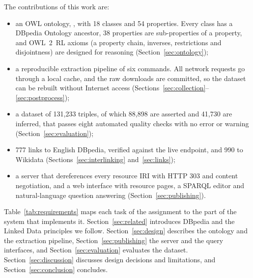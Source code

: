 The contributions of this work are:
\begin{itemize}
  \item an OWL ontology, , with 18 classes and 54 properties. Every
        class has a DBpedia Ontology ancestor, 38 properties are
        sub-properties of a  property, and OWL~2~RL axioms
        (a property chain, inverses, restrictions and disjointness) are
        designed for reasoning (Section~\ref{sec:ontology});
  \item a reproducible extraction pipeline of six commands. All network
        requests go through a local cache, and the raw downloads are
        committed, so the dataset can be rebuilt without Internet access
        (Sections~\ref{sec:collection}--\ref{sec:postprocess});
  \item a dataset of 131{,}233 triples, of which 88{,}898 are asserted and
        41{,}730 are inferred, that passes eight automated quality checks with
        no error or warning (Section~\ref{sec:evaluation});
  \item 777  links to English DBpedia, verified against the
        live endpoint, and 990 to Wikidata (Sections~\ref{sec:interlinking}
        and~\ref{sec:links});
  \item a server that dereferences every resource IRI with HTTP 303 and
        content negotiation, and a web interface with resource pages, a SPARQL
        editor and natural-language question answering
        (Section~\ref{sec:publishing}).
\end{itemize}

Table~\ref{tab:requirements} maps each task of the assignment to the part of
the system that implements it. Section~\ref{sec:related} introduces DBpedia
and the Linked Data principles we follow. Section~\ref{sec:design} describes
the ontology and the extraction pipeline, Section~\ref{sec:publishing} the
server and the query interfaces, and Section~\ref{sec:evaluation} evaluates the
dataset. Section~\ref{sec:discussion} discusses design decisions and
limitations, and Section~\ref{sec:conclusion} concludes.

